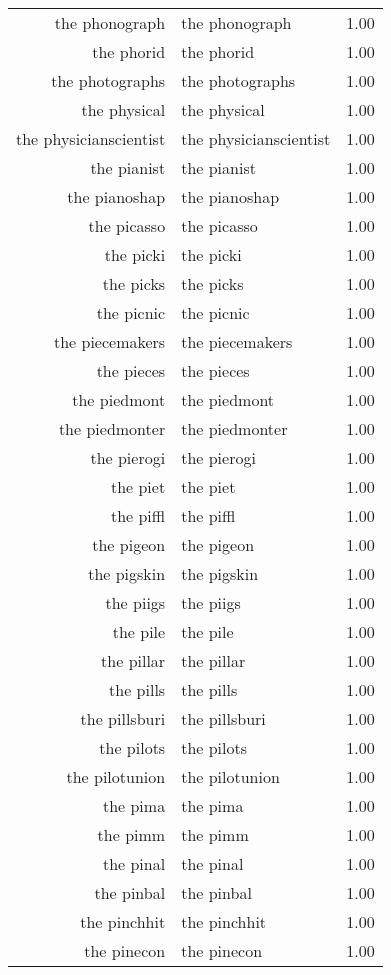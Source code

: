 \begin{table}[ht]
\begin{tabular}{rlr}
  the phonograph & the phonograph & 1.00 \\ 
  the phorid & the phorid & 1.00 \\ 
  the photographs & the photographs & 1.00 \\ 
  the physical & the physical & 1.00 \\ 
  the physicianscientist & the physicianscientist & 1.00 \\ 
  the pianist & the pianist & 1.00 \\ 
  the pianoshap & the pianoshap & 1.00 \\ 
  the picasso & the picasso & 1.00 \\ 
  the picki & the picki & 1.00 \\ 
  the picks & the picks & 1.00 \\ 
  the picnic & the picnic & 1.00 \\ 
  the piecemakers & the piecemakers & 1.00 \\ 
  the pieces & the pieces & 1.00 \\ 
  the piedmont & the piedmont & 1.00 \\ 
  the piedmonter & the piedmonter & 1.00 \\ 
  the pierogi & the pierogi & 1.00 \\ 
  the piet & the piet & 1.00 \\ 
  the piffl & the piffl & 1.00 \\ 
  the pigeon & the pigeon & 1.00 \\ 
  the pigskin & the pigskin & 1.00 \\ 
  the piigs & the piigs & 1.00 \\ 
  the pile & the pile & 1.00 \\ 
  the pillar & the pillar & 1.00 \\ 
  the pills & the pills & 1.00 \\ 
  the pillsburi & the pillsburi & 1.00 \\ 
  the pilots & the pilots & 1.00 \\ 
  the pilotunion & the pilotunion & 1.00 \\ 
  the pima & the pima & 1.00 \\ 
  the pimm & the pimm & 1.00 \\ 
  the pinal & the pinal & 1.00 \\ 
  the pinbal & the pinbal & 1.00 \\ 
  the pinchhit & the pinchhit & 1.00 \\ 
  the pinecon & the pinecon & 1.00 \\ 

\end{tabular}
\end{table}

